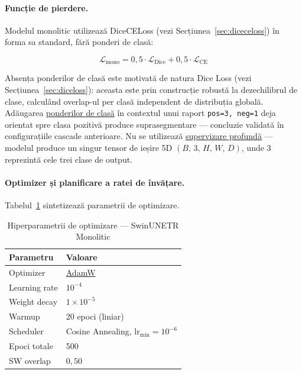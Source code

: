 \documentclass[12pt, a4paper]{report}
\begin{document}
\paragraph{Funcție de pierdere.}
Modelul monolitic utilizează
DiceCELoss (vezi Secțiunea~\ref{sec:diceceloss}) în forma sa
standard, fără ponderi de clasă:

\begin{equation}
    \mathcal{L}_{\text{mono}}
    = 0{,}5 \cdot \mathcal{L}_{\text{Dice}}
    + 0{,}5 \cdot \mathcal{L}_{\text{CE}}
\end{equation}

Absența ponderilor de clasă este motivată de natura
Dice Loss (vezi Secțiunea~\ref{sec:diceloss}): aceasta este prin construcție
robustă la dezechilibrul de clase, calculând overlap-ul per clasă
independent de distribuția globală. Adăugarea
\hyperref[sec:classweights]{ponderilor de clasă} în contextul
unui raport \texttt{pos=3, neg=1} deja orientat spre clasa
pozitivă produce suprasegmentare — concluzie validată în
configurațiile cascade anterioare.
Nu se utilizează \hyperref[sec:deepsupervision]{supervizare
profundă} — modelul produce un singur tensor de ieșire 5D
$(B,\, 3,\, H,\, W,\, D)$, unde $3$ reprezintă cele trei
clase de output.

\paragraph{Optimizer și planificare a ratei de învățare.}
Tabelul~\ref{tab:mono_optim} sintetizează parametrii de optimizare.

\begin{table}[H]
  \centering
  \caption{Hiperparametrii de optimizare — SwinUNETR Monolitic}
  \label{tab:mono_optim}
  \begin{tabular}{ll}
    \hline
    \textbf{Parametru} & \textbf{Valoare} \\
    \hline
    Optimizer        & \hyperref[sec:adamw]{AdamW} \\
    Learning rate    & $10^{-4}$ \\
    Weight decay     & $1 \times 10^{-5}$ \\
    Warmup           & 20 epoci (liniar) \\
    Scheduler        & Cosine Annealing,
                       $\text{lr}_{\min} = 10^{-6}$ \\
    Epoci totale     & 500 \\
    SW overlap       & $0{,}50$ \\
    \hline
  \end{tabular}
\end{table}
\end{document}
